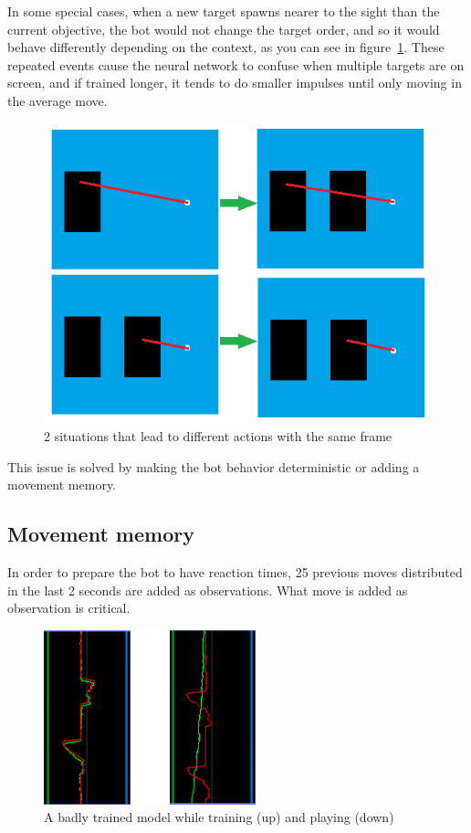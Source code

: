 In some special cases, when a new target spawns nearer to the sight than the current objective, the bot would not change the target order, and so it would behave differently depending on the context, as you can see in figure~\ref{fig:exDeterminism}. These repeated events cause the neural network to confuse when multiple targets are on screen, and if trained longer, it tends to do smaller impulses until only moving in the average move.

\begin{figure}[h]
  \centering
		\includegraphics[width=.9\textwidth]{img/exampleDet.png}
  \caption{2 situations that lead to different actions with the same frame}
  \label{fig:exDeterminism}
\end{figure}

This issue is solved by making the bot behavior deterministic or adding a movement memory.

\subsection{Movement memory}
\label{sec:movememory}

In order to prepare the bot to have reaction times, 25 previous moves distributed in the last 2 seconds are added as observations. What move is added as observation is critical.

\begin{figure}[h]
  \centering
		\includegraphics[width=.5\textwidth]{img/graphsMemory.png}
  \caption{A badly trained model while training (up) and playing (down)}
  \label{fig:graphMem}
\end{figure}

